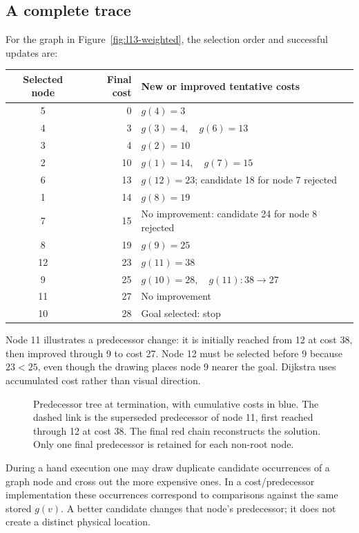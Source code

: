 \subsection{A complete trace}
For the graph in Figure~\ref{fig:l13-weighted}, the selection order and
successful updates are:
\begin{center}
\begin{tabular}{crl}
\toprule
Selected node & Final cost & New or improved tentative costs\\
\midrule
5 & 0 & $g(4)=3$\\
4 & 3 & $g(3)=4,\quad g(6)=13$\\
3 & 4 & $g(2)=10$\\
2 & 10 & $g(1)=14,\quad g(7)=15$\\
6 & 13 & $g(12)=23$; candidate 18 for node 7 rejected\\
1 & 14 & $g(8)=19$\\
7 & 15 & No improvement: candidate 24 for node 8 rejected\\
8 & 19 & $g(9)=25$\\
12 & 23 & $g(11)=38$\\
9 & 25 & $g(10)=28,\quad g(11):38\to27$\\
11 & 27 & No improvement\\
10 & 28 & Goal selected: stop\\
\bottomrule
\end{tabular}
\end{center}
Node 11 illustrates a predecessor change: it is initially reached from
12 at cost 38, then improved through 9 to cost 27. Node 12 must be selected
before 9 because $23<25$, even though the drawing places node 9 nearer
the goal. Dijkstra uses accumulated cost rather than visual direction.

\begin{figure}[htbp]
\centering
\caption{Predecessor tree at termination, with cumulative costs in blue.
The dashed link is the superseded predecessor of node 11, first reached
through 12 at cost 38. The final red chain reconstructs the solution.
Only one final predecessor is retained for each non-root node.}
\label{fig:l13-tree}
\end{figure}

During a hand execution one may draw duplicate candidate occurrences of
a graph node and cross out the more expensive ones. In a cost/predecessor
implementation these occurrences correspond to comparisons against the
same stored $g(v)$. A better candidate changes that node's predecessor;
it does not create a distinct physical location.


